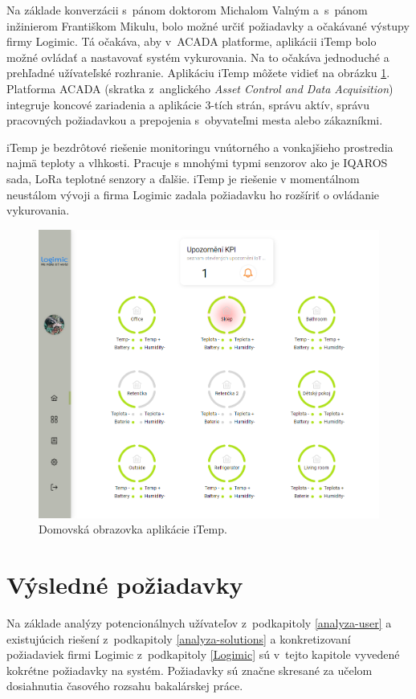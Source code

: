 Na základe konverzácii s~pánom doktorom Michalom Valným a~s~pánom inžinierom Františkom Mikulu, bolo možné určiť požiadavky a očakávané výstupy firmy Logimic. 
Tá očakáva, aby v~ACADA platforme, aplikácii iTemp bolo možné ovládať a nastavovať systém vykurovania. 
Na to očakáva jednoduché a prehľadné užívateľské rozhranie. Aplikáciu iTemp môžete vidieť na obrázku \ref{fig:iTemp}.
Platforma ACADA (skratka z~anglického \emph{Asset Control and Data Acquisition}) integruje koncové zariadenia a aplikácie 3-tích strán, správu aktív, správu pracovných požiadavkou a prepojenia s~obyvateľmi mesta alebo zákazníkmi.

iTemp je bezdrôtové riešenie monitoringu vnútorného a vonkajšieho prostredia najmä teploty a vlhkosti. 
Pracuje s mnohými typmi senzorov ako je IQAROS sada, LoRa teplotné senzory a ďalšie. 
iTemp je riešenie v momentálnom neustálom vývoji a firma Logimic zadala požiadavku ho rozšíriť o ovládanie vykurovania.

\begin{figure}[H]
    \centering
    \includegraphics[width=\textwidth]{obrazky-figures/Screenshot_12.png}
    \caption{Domovská obrazovka aplikácie iTemp.}
    \label{fig:iTemp}
\end{figure}

\section{Výsledné požiadavky}\label{analyza-requirements}
Na základe analýzy potencionálnych užívateľov z~podkapitoly \ref{analyza-user} a  existujúcich riešení z~podkapitoly \ref{analyza-solutions} a konkretizovaní požiadaviek firmi Logimic z~podkapitoly \ref{Logimic} sú v~tejto kapitole vyvedené kokrétne požiadavky na systém. 
Požiadavky sú značne skresané za učelom dosiahnutia časového rozsahu bakalárskej práce.


